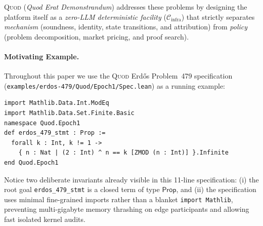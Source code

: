 \documentclass[sigplan,nonacm,10pt]{acmart}
\newcommand{\Cinfra}{\mathcal{C}_{\mathrm{infra}}}
\newcommand{\Prop}{\mathsf{Prop}}
\newcommand{\code}[1]{\texttt{#1}}
\begin{document}
\textsc{Quod} (\emph{Quod Erat Demonstrandum}) addresses these problems by designing the platform itself as a \emph{zero-LLM deterministic facility} ($\Cinfra$) that strictly separates \emph{mechanism} (soundness, identity, state transitions, and attribution) from \emph{policy} (problem decomposition, market pricing, and proof search).

\paragraph{Motivating Example.}
Throughout this paper we use the \textsc{Quod} Erd\H{o}s Problem~479 specification (\code{examples/\-erdos-479/\-Quod/\-Epoch1/\-Spec.lean}) as a running example:
\begin{lstlisting}[language=LeanFour]
import Mathlib.Data.Int.ModEq
import Mathlib.Data.Set.Finite.Basic
namespace Quod.Epoch1
def erdos_479_stmt : Prop :=
  forall k : Int, k != 1 ->
    { n : Nat | (2 : Int) ^ n == k [ZMOD (n : Int)] }.Infinite
end Quod.Epoch1
\end{lstlisting}
Notice two deliberate invariants already visible in this 11-line specification: (i) the root goal \code{erdos\_479\_stmt} is a closed term of type $\Prop$, and (ii) the specification uses minimal fine-grained imports rather than a blanket \code{import Mathlib}, preventing multi-gigabyte memory thrashing on edge participants and allowing fast isolated kernel audits.
\end{document}
